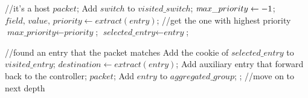 \documentclass[conference]{IEEEtran}
\begin{document}
\begin{algorithm}[ht]
  \begin{algorithmic}[1]
       //it's a host
        \State \Return $packet$;
      \EndIf
      \State Add $switch$ to $visited\_switch$;
      \State $\textit max\_priority \gets -1$;  
        \State $\textit{field, value, priority} \gets extract(\textit{entry})$;
         //get the one with highest priority 
          \State $\textit{max\_priority} \gets \textit{priority}$;
          \State $\textit{selected\_entry} \gets \textit{entry}$; 
        \EndIf
      \EndFor

       //found an entry that the packet matches
        \State Add the cookie of $selected\_entry$ to $visited\_entry$;
        \State $\textit{destination} \gets extract(\textit{entry})$;
          \State Add auxiliary entry that forward back to the controller;
          \State \Return $packet$;
        \Else
          \State Add $entry$ to $aggregated\_group$;
          \State {}; //move on to next depth
        \EndIf
      \EndIf
  \end{algorithmic}
\end{algorithm}
\end{document}
